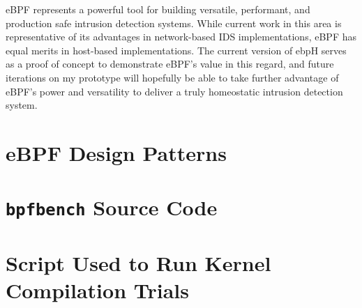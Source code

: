 \documentclass[
  12pt]{findlay}
\begin{document}
\clearpage

eBPF represents a powerful tool for building versatile, performant, and
production safe intrusion detection systems. While current work in this
area is representative of its advantages in network-based IDS
implementations, eBPF has equal merits in host-based implementations.
The current version of ebpH serves as a proof of concept to demonstrate
eBPF's value in this regard, and future iterations on my prototype will
hopefully be able to take further advantage of eBPF's power and
versatility to deliver a truly homeostatic intrusion detection system.

\clearpage
{}
\printbibliography
\clearpage

\appendix
\appendixpage

\hypertarget{ebpf-design-patterns}{%
\section{eBPF Design Patterns}\label{ebpf-design-patterns}}

\label{ebpf-design-patterns}


\FloatBarrier

\clearpage

\hypertarget{bpfbench-source-code}{%
\section{\texorpdfstring{\texttt{bpfbench} Source
Code}{bpfbench Source Code}}\label{bpfbench-source-code}}

\label{bpfbench}


\FloatBarrier

\clearpage

\hypertarget{script-used-to-run-kernel-compilation-trials}{%
\section{Script Used to Run Kernel Compilation
Trials}\label{script-used-to-run-kernel-compilation-trials}}

\label{appendix:kernel}

\end{document}
